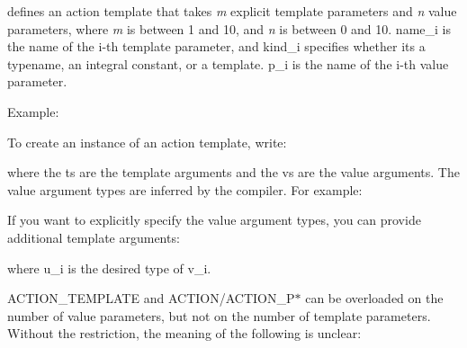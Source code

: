 defines an action template that takes {\itshape m} explicit template parameters and {\itshape n} value parameters, where {\itshape m} is between 1 and 10, and {\itshape n} is between 0 and 10. {\ttfamily name\+\_\+i} is the name of the i-\/th template parameter, and {\ttfamily kind\+\_\+i} specifies whether it\textquotesingle{}s a {\ttfamily typename}, an integral constant, or a template. {\ttfamily p\+\_\+i} is the name of the i-\/th value parameter.

Example\+: 
\begin{DoxyCode}{0}
\DoxyCodeLine{\}}
\end{DoxyCode}


To create an instance of an action template, write\+: 
\begin{DoxyCode}{0}
\end{DoxyCode}
 where the {\ttfamily t}s are the template arguments and the {\ttfamily v}s are the value arguments. The value argument types are inferred by the compiler. For example\+: 
\begin{DoxyCode}{0}
\end{DoxyCode}


If you want to explicitly specify the value argument types, you can provide additional template arguments\+: 
\begin{DoxyCode}{0}
\end{DoxyCode}
 where {\ttfamily u\+\_\+i} is the desired type of {\ttfamily v\+\_\+i}.

{\ttfamily A\+C\+T\+I\+O\+N\+\_\+\+T\+E\+M\+P\+L\+A\+TE} and {\ttfamily A\+C\+T\+I\+ON}/{\ttfamily A\+C\+T\+I\+O\+N\+\_\+\+P$\ast$} can be overloaded on the number of value parameters, but not on the number of template parameters. Without the restriction, the meaning of the following is unclear\+:


